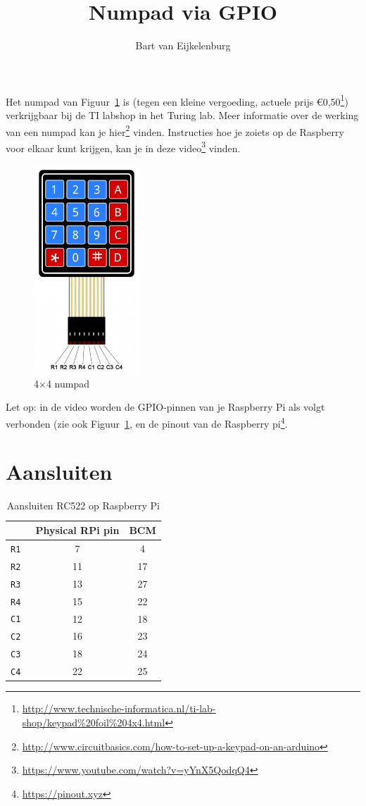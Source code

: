 \documentclass{guide}
\title{Numpad via GPIO}
\author{Bart van Eijkelenburg}
\begin{document}
Het numpad van Figuur~\ref{fig:numpad} is (tegen een kleine vergoeding, actuele prijs \euro 0,50\footnote{\url{http://www.technische-informatica.nl/ti-lab-shop/keypad\%20foil\%204x4.html}}) verkrijgbaar bij de TI labshop in het Turing lab. Meer informatie over de werking van een numpad kan je hier\footnote{\url{http://www.circuitbasics.com/how-to-set-up-a-keypad-on-an-arduino}} vinden. Instructies hoe je zoiets op de Raspberry voor elkaar kunt krijgen, kan je in deze video\footnote{\url{https://www.youtube.com/watch?v=yYnX5QodqQ4}} vinden.

\begin{figure}[h]
  \centering
  \includegraphics[width=4cm]{images/numpad.png}
  \caption{4$\times$4 numpad} \label{fig:numpad}
\end{figure}


Let op: in de video worden de GPIO-pinnen van je Raspberry Pi als volgt verbonden (zie ook Figuur~\ref{fig:numpad}, en de pinout van de Raspberry pi\footnote{\url{https://pinout.xyz}}.

\section{Aansluiten}

\begin{table}[h]
  \centering
  \begin{tabular}{|r|c|c|}
    \hline
    & \bf Physical RPi pin & \bf BCM \\
    \hline
      \tt R1 & 7 & 4 \\
    \hline
      \tt R2 & 11 & 17 \\
    \hline
      \tt R3 & 13 & 27 \\
    \hline
      \tt R4 & 15 & 22 \\
    \hline
      \tt C1 & 12 & 18 \\
    \hline
      \tt C2 & 16 & 23 \\
    \hline
      \tt C3 & 18 & 24 \\
    \hline
      \tt C4 & 22 & 25 \\
    \hline
  \end{tabular}
  \caption{Aansluiten RC522 op Raspberry Pi}\label{tab:pins}
\end{table}
\end{document}
